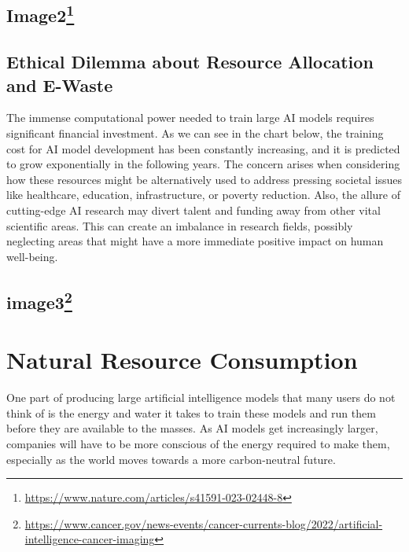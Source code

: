 \documentclass[
]{book}
\begin{document}
\hypertarget{image26}{%
\section[Image2]{\texorpdfstring{Image2\footnote{\url{https://www.nature.com/articles/s41591-023-02448-8}}}{Image2}}\label{image26}}

\hypertarget{ethical-dilemma-about-resource-allocation-and-e-waste}{%
\section{Ethical Dilemma about Resource Allocation and E-Waste}\label{ethical-dilemma-about-resource-allocation-and-e-waste}}

The immense computational power needed to train large AI models requires significant financial investment. As we can see in the chart below, the training cost for AI model development has been constantly increasing, and it is predicted to grow exponentially in the following years. The concern arises when considering how these resources might be alternatively used to address pressing societal issues like healthcare, education, infrastructure, or poverty reduction. Also, the allure of cutting-edge AI research may divert talent and funding away from other vital scientific areas. This can create an imbalance in research fields, possibly neglecting areas that might have a more immediate positive impact on human well-being.

\hypertarget{image37}{%
\section[image3]{\texorpdfstring{image3\footnote{\url{https://www.cancer.gov/news-events/cancer-currents-blog/2022/artificial-intelligence-cancer-imaging}}}{image3}}\label{image37}}

\hypertarget{natural-resource-consumption}{%
\chapter{Natural Resource Consumption}\label{natural-resource-consumption}}

One part of producing large artificial intelligence models that many users do not think of is the energy and water it takes to train these models and run them before they are available to the masses. As AI models get increasingly larger, companies will have to be more conscious of the energy required to make them, especially as the world moves towards a more carbon-neutral future.
\end{document}
